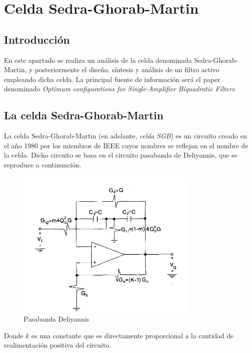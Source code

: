 \section{Celda Sedra-Ghorab-Martin}

\subsection{Introducci\'on}
En este apartado se realiza un an\'alisis de la celda denominada Sedra-Ghorab-Martin, y posteriormente el dise\~no, s\'intesis y an\'alisis de un filtro activo empleando dicha celda. La principal fuente de informaci\'on ser\'a el paper denominado \textit{Optimum configurations for Single-Amplifier Biquadratic Filters}

\subsection{La celda Sedra-Ghorab-Martin}

La celda Sedra-Ghorab-Martin (en adelante, \textit{celda SGB}) es un circuito creado en el a\~no 1980 por los miembros de IEEE cuyos nombres se reflejan en el nombre de la celda. Dicho circuito se basa en el circuito pasabanda de Deliyannis, que se reproduce a continuaci\'on.

\begin{figure}[H] \label{fig:EJ3_deliyannis}
    \centering
    \includegraphics[width=0.8\textwidth]{../EJ3/Resources/deliyannis_cell.png}
    \caption{Pasabanda Deliyannis}
\end{figure}

Donde $k$ es una constante que es directamente proporcional a la cantidad de realimentaci\'on positiva del circuito.

